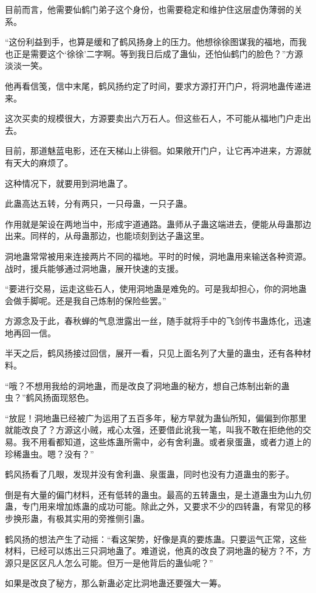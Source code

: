 \begin{this_body}
目前而言，他需要仙鹤门弟子这个身份，也需要稳定和维护住这层虚伪薄弱的关系。

“这份利益到手，也算是缓和了鹤风扬身上的压力。他想徐徐图谋我的福地，而我也正是需要这个‘徐徐’二字啊。等到我日后成了蛊仙，还怕仙鹤门的脸色？”方源淡淡一笑。

他再看信笺，信中末尾，鹤风扬约定了时间，要求方源打开门户，将洞地蛊传递进来。

这次买卖的规模很大，方源要卖出六万石人。但这些石人，不可能从福地门户走出去。

目前，那道魅蓝电影，还在天梯山上徘徊。如果敞开门户，让它再冲进来，方源就有天大的麻烦了。

这种情况下，就要用到洞地蛊了。

此蛊高达五转，分有两只，一只母蛊，一只子蛊。

作用就是架设在两地当中，形成宇道通路。蛊师从子蛊这端进去，便能从母蛊那边出来。同样的，从母蛊那边，也能顷刻到达子蛊这里。

洞地蛊常常被用来连接两片不同的福地。平时的时候，洞地蛊用来输送各种资源。战时，援兵能够通过洞地蛊，展开快速的支援。

“要进行交易，运走这些石人，使用洞地蛊是难免的。可是我却担心，你的洞地蛊会做手脚呢。还是我自己炼制的保险些罢。”

方源念及于此，春秋蝉的气息泄露出一丝，随手就将手中的飞剑传书蛊炼化，迅速地再回一信。

半天之后，鹤风扬接过回信，展开一看，只见上面名列了大量的蛊虫，还有各种材料。

“哦？不想用我给的洞地蛊，而是改良了洞地蛊的秘方，想自己炼制出新的蛊虫？”鹤风扬面现怒色。

“放屁！洞地蛊已经被广为运用了五百多年，秘方早就为蛊仙所知，偏偏到你那里就能改良了？方源这小贼，戒心太强，还要借此讹我一笔，叫我不敢在拒绝他的交易。我不用看都知道，这些炼蛊所需中，必有舍利蛊。或者泉蛋蛊，或者力道上的珍稀蛊虫。嗯？没有？”

鹤风扬看了几眼，发现并没有舍利蛊、泉蛋蛊，同时也没有力道蛊虫的影子。

倒是有大量的偏门材料，还有低转的蛊虫。最高的五转蛊虫，是土道蛊虫为山九仞蛊，专门用来增加炼蛊的成功可能。除此之外，又要求不少的四转蛊，有常见的移步换形蛊，有极其实用的旁推侧引蛊。

鹤风扬的想法产生了动摇：“看这架势，好像是真的要炼蛊。只要运气正常，这些材料，已经可以炼出三只洞地蛊了。难道说，他真的改良了洞地蛊的秘方？不，方源只是区区凡人怎么可能。但万一是他背后的蛊仙呢？”

如果是改良了秘方，那么新蛊必定比洞地蛊还要强大一筹。


\end{this_body}
